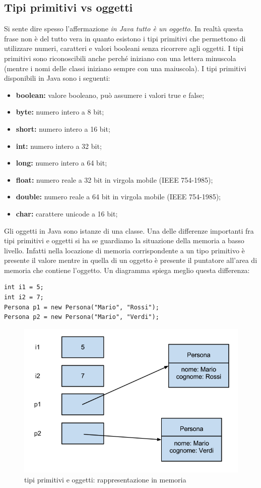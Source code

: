 \subsection{Tipi primitivi vs oggetti}
Si sente dire spesso l’affermazione \textit{in Java tutto è un oggetto}. In realtà questa frase non è del tutto vera in quanto esistono i tipi primitivi che permettono di utilizzare numeri, caratteri e valori booleani senza ricorrere agli oggetti. I tipi primitivi sono riconoscibili anche perché iniziano con una lettera minuscola (mentre i nomi delle classi iniziano sempre con una maiuscola). I tipi primitivi disponibili in Java sono i seguenti:
\begin{itemize}
\item \textbf{boolean:} valore booleano, può assumere i valori true e false;
\item \textbf{byte:} numero intero a 8 bit;
\item \textbf{short:} numero intero a 16 bit;
\item \textbf{int:} numero intero a 32 bit;
\item \textbf{long:} numero intero a 64 bit;
\item \textbf{float:} numero reale a 32 bit in virgola mobile (IEEE 754-1985);
\item \textbf{double:} numero reale a 64 bit in virgola mobile (IEEE 754-1985);
\item \textbf{char:} carattere unicode a 16 bit;
\end{itemize}
Gli oggetti in Java sono istanze di una classe.
Una delle differenze importanti fra tipi primitivi e oggetti si ha se guardiamo la situazione della memoria a basso livello. Infatti nella locazione di memoria corrispondente a un tipo primitivo è presente il valore mentre in quella di un oggetto è presente il puntatore all’area di memoria che contiene l’oggetto. Un diagramma spiega meglio questa differenza:
\begin{lstlisting}
int i1 = 5;
int i2 = 7;
Persona p1 = new Persona("Mario", "Rossi");
Persona p2 = new Persona("Mario", "Verdi");
\end{lstlisting}
\begin{figure}[H]
\centering
\includegraphics[scale=0.42]{images/tipiPrimitivi}
\caption{tipi primitivi e oggetti: rappresentazione in memoria\label{fig:UC3}}
\end{figure}

